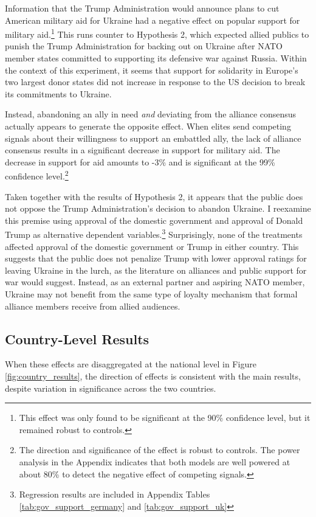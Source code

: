 Information that the Trump Administration would announce plans to cut American military aid for Ukraine had a negative effect on popular support for military aid.\footnote{This effect was only found to be significant at the 90\% confidence level, but it remained robust to controls.} This runs counter to Hypothesis 2, which expected allied publics to punish the Trump Administration for backing out on Ukraine after NATO member states committed to supporting its defensive war against Russia. Within the context of this experiment, it seems that support for solidarity in Europe's two largest donor states did not increase in response to the US decision to break its commitments to Ukraine. 

Instead, abandoning an ally in need \emph{and} deviating from the alliance consensus actually appears to generate the opposite effect. When elites send competing signals about their willingness to support an embattled ally, the lack of alliance consensus results in a significant decrease in support for military aid. The decrease in support for aid amounts to -3\% and is significant at the 99\% confidence level.\footnote{The direction and significance of the effect is robust to controls. The power analysis in the Appendix indicates that both models are well powered at about 80\% to detect the negative effect of competing signals.} 

Taken together with the results of Hypothesis 2, it appears that the public does not oppose the Trump Administration's decision to abandon Ukraine. I reexamine this premise using approval of the domestic government and approval of Donald Trump as alternative dependent variables.\footnote{Regression results are included in Appendix Tables \ref{tab:gov_support_germany} and \ref{tab:gov_support_uk}} Surprisingly, none of the treatments affected approval of the domestic government or Trump in either country. This suggests that the public does not penalize Trump with lower approval ratings for leaving Ukraine in the lurch, as the literature on alliances and public support for war would suggest. \autocite{chiba_careful_2015, tomz&weeks2021, levin_art_2022} Instead, as an external partner and aspiring NATO member,\autocite{noauthor_relations_2025} Ukraine may not benefit from the same type of loyalty mechanism that formal alliance members receive from allied audiences.\autocite{tomzNATO2023} 

\subsection{Country-Level Results}
When these effects are disaggregated at the national level in Figure \ref{fig:country_results}, the direction of effects is consistent with the main results, despite variation in significance across the two countries. 


